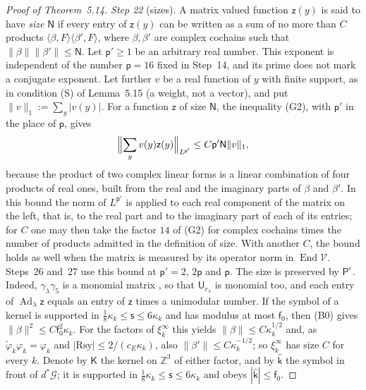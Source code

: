 \documentclass[11pt]{amsart}
\theoremstyle{definition}
\begin{document}
\begin{proof}[Proof of Theorem~5.14]
\emph{Step 22} (sizes).
A matrix valued function $\mathsf z(y)$ is said to have \emph{size} $\mathsf N$ if every entry of $\mathsf z(y)$ can be written as a sum of no more than $C$ products $\langle\beta,F\rangle\langle\beta',F\rangle$, where $\beta,\beta'$ are complex cochains such that $\|\beta\|\|\beta'\|\le\mathsf N$.
Let $\mathsf p'\ge1$ be an arbitrary real number.
This exponent is independent of the number $\mathsf p=16$ fixed in Step~14, and its prime does not mark a conjugate exponent.
Let further $v$ be a real function of $y$ with finite support, as in condition (S) of Lemma~5.15 (a weight, not a vector), and put $\|v\|_1:=\sum_y|v(y)|$.
For a function $\mathsf z$ of size $\mathsf N$, the inequality (G2), with $\mathsf p'$ in the place of $\mathsf p$, gives
\begin{equation*}
\Bigl\|\sum_yv(y)\mathsf z(y)\Bigr\|_{L^{\mathsf p'}}\le C\mathsf p'\mathsf N\|v\|_1,
\end{equation*}
because the product of two complex linear forms is a linear combination of four products of real ones, built from the real and the imaginary parts of $\beta$ and $\beta'$.
In this bound the norm of $L^{\mathsf p'}$ is applied to each real component of the matrix on the left, that is, to the real part and to the imaginary part of each of its entries;
for $C$ one may then take the factor $14$ of (G2) for complex cochains times the number of products admitted in the definition of size.
With another $C$, the bound holds as well when the matrix is measured by its operator norm in $\operatorname{End}\mathcal V$.
Steps~26 and~27 use this bound at $\mathsf p'=2$, $2\mathsf p$ and $\mathsf p$.
The size is preserved by $\mathsf P^\varepsilon$.
Indeed, $\gamma_\lambda\gamma_5$ is a monomial matrix \cite[(I.c6)]{QEDIII}, so that $\mathsf U_{r_\lambda}$ is monomial too, and each entry of $\operatorname{Ad}_\lambda\mathsf z$ equals an entry of $\mathsf z$ times a unimodular number.
If the symbol of a kernel is supported in $\frac18\kappa_k\le\mathsf s\le6\kappa_k$ and has modulus at most $\mathsf f_0$, then (B0) gives $\|\beta\|^2\le C\mathsf f_0^2\kappa_k$.
For the factors of $\xi_k^\infty$ this yields $\|\beta\|\le C\kappa_k^{1/2}$ and, as $\tilde\varphi_k\varphi_k=\varphi_k$ and $|\mathrm{Rsy}|\le2/(c_E\kappa_k)$, also $\|\beta'\|\le C\kappa_k^{-1/2}$; so $\xi_k^\infty$ has size $C$ for every $k$.
Denote by $\mathsf K$ the kernel on $\mathbb Z^3$ of either factor, and by $\hat{\mathsf k}$ the symbol in front of $d^*\mathcal G$; it is supported in $\frac18\kappa_k\le\mathsf s\le6\kappa_k$ and obeys $|\hat{\mathsf k}|\le\mathsf f_0$.

\end{proof}
\end{document}

